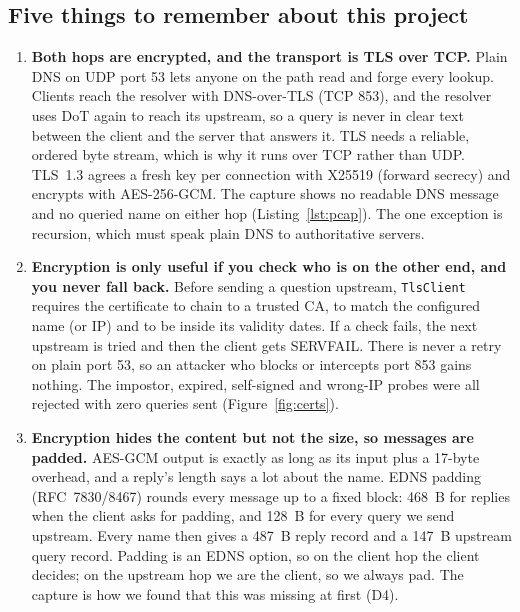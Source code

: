 \documentclass[11pt,a4paper]{article}
\newcommand{\code}[1]{\texttt{#1}}
\begin{document}
\subsection{Five things to remember about this project}\label{sec:five}
\begin{tcolorbox}[breakable, enhanced jigsaw, colback=codebg, colframe=black!35, boxrule=0.4pt, arc=0pt, left=4pt, right=4pt, top=3pt, bottom=3pt]
\begin{enumerate}[leftmargin=*, itemsep=4pt]
  \item \textbf{Both hops are encrypted, and the transport is TLS over TCP.} Plain DNS on UDP port 53 lets
  anyone on the path read and forge every lookup. Clients reach the resolver with DNS-over-TLS (TCP 853), and
  the resolver uses DoT again to reach its upstream, so a query is never in clear text between the client and
  the server that answers it. TLS needs a reliable, ordered byte stream, which is why it runs over TCP rather
  than UDP. TLS~1.3 agrees a fresh key per connection with X25519 (forward secrecy) and encrypts with
  AES-256-GCM. The capture shows no readable DNS message and no queried name on either hop
  (Listing~\ref{lst:pcap}). The one exception is recursion, which must speak plain DNS to authoritative servers.
  \item \textbf{Encryption is only useful if you check who is on the other end, and you never fall back.} Before
  sending a question upstream, \code{TlsClient} requires the certificate to chain to a trusted CA, to match the
  configured name (or IP) and to be inside its validity dates. If a check fails, the next upstream is tried and
  then the client gets SERVFAIL. There is never a retry on plain port 53, so an attacker who blocks or
  intercepts port 853 gains nothing. The impostor, expired, self-signed and wrong-IP probes were all rejected
  with zero queries sent (Figure~\ref{fig:certs}).
  \item \textbf{Encryption hides the content but not the size, so messages are padded.} AES-GCM output is exactly
  as long as its input plus a 17-byte overhead, and a reply's length says a lot about the name. EDNS padding
  (RFC~7830/8467) rounds every message up to a fixed block: 468~B for replies when the client asks for padding,
  and 128~B for every query we send upstream. Every name then gives a 487~B reply record and a 147~B upstream
  query record. Padding is an EDNS option, so on the client hop the client decides; on the upstream hop we are
  the client, so we always pad. The capture is how we found that this was missing at first (D4).

\end{enumerate}
\end{tcolorbox}
\end{document}
